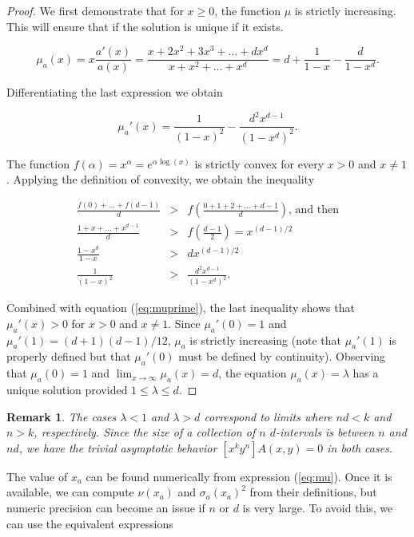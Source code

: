 \documentclass{article}
\newtheorem{remark}{Remark}
\begin{document}
\begin{proof}
We first demonstrate that for $x \geq 0$, the function $\mu$ is
strictly increasing. This will ensure that if the solution is unique if
it exists.

\begin{equation}
\label{eq:mu}
\mu_a(x) = x\frac{a'(x)}{a(x)} =
\frac{x+2x^2+3x^3+\ldots+dx^d}{x+x^2+\ldots+x^d} =
d+\frac{1}{1-x} - \frac{d}{1-x^d}.
\end{equation} 

Differentiating the last expression we obtain

\begin{equation}
\label{eq:muprime}
\mu_a'(x) = \frac{1}{(1-x)^2} -\frac{d^2x^{d-1}}{(1-x^d)^2}.
\end{equation}

The function $f(\alpha) = x^{\alpha} = e^{\alpha \log(x)}$ is strictly
convex for every $x > 0$ and $x \neq 1$. Applying the definition of
convexity, we obtain the inequality

\begin{eqnarray*}
\frac{f(0)+\ldots+f(d-1)}{d} &>&
f\left(\frac{0+1+2+\ldots+d-1}{d}\right) \text{, and then} \\
\frac{1+x+\ldots+x^{d-1}}{d} &>& f\left(\frac{d-1}{2}\right)
= x^{(d-1)/2} \\
\frac{1-x^d}{1-x} &>& dx^{(d-1)/2} \\
\frac{1}{(1-x)^2} &>& \frac{d^2x^{d-1}}{(1-x^d)^2}.
\end{eqnarray*}

Combined with equation (\ref{eq:muprime}), the last inequality shows that
$\mu_a'(x) > 0$ for $x > 0$ and $x \neq 1$. Since $\mu_a'(0) = 1$ and
$\mu_a'(1) = (d+1)(d-1)/12$, $\mu_a$ is strictly increasing (note that
$\mu_a'(1)$ is properly defined but that $\mu_a'(0)$ must be defined by
continuity).  Observing that $\mu_a(0) = 1$ and
$\lim_{x\rightarrow\infty} \mu_a(x) = d$, the equation
$\mu_a(x) = \lambda$ has a unique solution
provided $1 \leq \lambda \leq d$.
\end{proof}

\begin{remark}
The cases $\lambda < 1$ and $\lambda > d$ correspond to limits where $nd <
k$ and $n > k$, respectively. Since the size of a collection of $n$
$d$-intervals is between $n$ and $nd$, we have the trivial asymptotic
behavior $[x^ky^n]A(x,y) = 0$ in both cases.
\end{remark}


The value of $x_a$ can be found numerically from expression
(\ref{eq:mu}).  Once it is available, we can compute $\nu(x_a)$ and
$\sigma_a(x_a)^2$ from their definitions, but numeric precision can
become an issue if $n$ or $d$ is very large. To avoid this, we can use the
equivalent expressions
\end{document}
